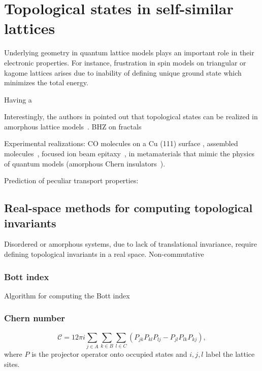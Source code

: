\chapter{Topological states in self-similar lattices}
\label{ch:fractals}
Underlying geometry in quantum lattice models plays an important role in their electronic properties. For instance, frustration in spin models on triangular or kagome lattices arises due to inability of defining unique ground state which minimizes the total energy.


 Having a 

Interestingly, the authors in pointed out that topological states can be realized in amorphous lattice models~\cite{AmorphTIShenoy2017}. BHZ on fractals~\cite{2018:BHZ}






Experimental realizations: CO molecules on a Cu (111) surface \cite{Kempkes2019}, assembled molecules~\cite{Shang2015}, focused ion beam epitaxy~\cite{FIBSC}, in metamaterials that mimic the physics of quantum models (amorphous Chern insulators~\cite{Gyrosc2018Irvine}).



Prediction of peculiar transport properties: \cite{2016:TomadinTransport1, 2017:YuanOptCond}


\section{Real-space methods for computing topological invariants}
Disordered or amorphous systems, due to lack of translational invariance, require defining topological invariants in a real space. Non-commutative
\subsection*{Bott index}
Algorithm for computing the Bott index~\cite{BottIdx}

\subsection*{Chern number}


\begin{equation}
\mathcal{C} = 12 \pi i \sum_{j \in A} \sum_{k \in B} \sum_{l \in C} \left( P_{jk} P_{kl} P_{lj} - P_{jl} P_{lk} P_{kj} \right),
\label{eq: chern_real}
\end{equation}
where $P$ is the projector operator onto occupied states and $i, j, l$ label the lattice sites.

